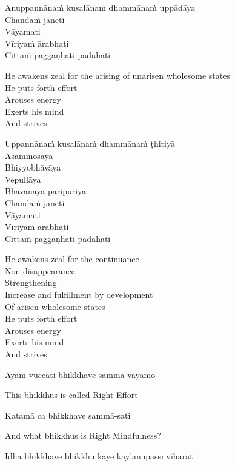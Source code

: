 Anuppannānaṁ kusalānaṁ dhammānaṁ uppādāya\\
Chandaṁ janeti\\
Vāyamati\\
Vīriyaṁ ārabhati\\
Cittaṁ paggaṇhāti padahati

\begin{english-verses}
  He awakens zeal for the arising of unarisen wholesome states\\
  He puts forth effort\\
  Arouses energy\\
  Exerts his mind\\
  And strives
\end{english-verses}

Uppannānaṁ kusalānaṁ dhammānaṁ ṭhitiyā\\
Asammosāya\\
Bhiyyobhāvāya\\
Vepullāya\\
Bhāvanāya pāripūriyā\\
Chandaṁ janeti\\
Vāyamati\\
Vīriyaṁ ārabhati\\
Cittaṁ paggaṇhāti padahati

\begin{english-verses}
  He awakens zeal for the continuance\\
  Non-disappearance\\
  Strengthening\\
  Increase and fulfillment by development\\
  Of arisen wholesome states\\
  He puts forth effort\\
  Arouses energy\\
  Exerts his mind\\
  And strives
\end{english-verses}

Ayaṁ vuccati bhikkhave sammā-vāyāmo

\begin{english}
  This bhikkhus is called Right Effort
\end{english}

Katamā ca bhikkhave sammā-sati

\begin{english}
  And what bhikkhus is Right Mindfulness?
\end{english}

Idha bhikkhave bhikkhu kāye kāy'ānupassī viharati

